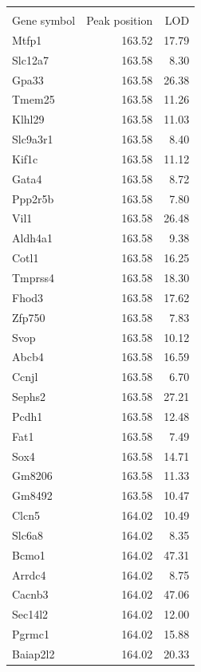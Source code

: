 \documentclass{article}
\begin{document}
\printbibliography

\newpage
\begin{longtable}{lrr}
\hline \\

Gene symbol & Peak position & LOD \\ 
  \hline
Mtfp1 & 163.52 & 17.79 \\ 
  Slc12a7 & 163.58 & 8.30 \\ 
  Gpa33 & 163.58 & 26.38 \\ 
  Tmem25 & 163.58 & 11.26 \\ 
  Klhl29 & 163.58 & 11.03 \\ 
  Slc9a3r1 & 163.58 & 8.40 \\ 
  Kif1c & 163.58 & 11.12 \\ 
  Gata4 & 163.58 & 8.72 \\ 
  Ppp2r5b & 163.58 & 7.80 \\ 
  Vil1 & 163.58 & 26.48 \\ 
  Aldh4a1 & 163.58 & 9.38 \\ 
  Cotl1 & 163.58 & 16.25 \\ 
  Tmprss4 & 163.58 & 18.30 \\ 
  Fhod3 & 163.58 & 17.62 \\ 
  Zfp750 & 163.58 & 7.83 \\ 
  Svop & 163.58 & 10.12 \\ 
  Abcb4 & 163.58 & 16.59 \\ 
  Ccnjl & 163.58 & 6.70 \\ 
  Sephs2 & 163.58 & 27.21 \\ 
  Pcdh1 & 163.58 & 12.48 \\ 
  Fat1 & 163.58 & 7.49 \\ 
  Sox4 & 163.58 & 14.71 \\ 
  Gm8206 & 163.58 & 11.33 \\ 
  Gm8492 & 163.58 & 10.47 \\ 
  Clcn5 & 164.02 & 10.49 \\ 
  Slc6a8 & 164.02 & 8.35 \\ 
  Bcmo1 & 164.02 & 47.31 \\ 
  Arrdc4 & 164.02 & 8.75 \\ 
  Cacnb3 & 164.02 & 47.06 \\ 
  Sec14l2 & 164.02 & 12.00 \\ 
  Pgrmc1 & 164.02 & 15.88 \\ 
  Baiap2l2 & 164.02 & 20.33 \\ 

\end{longtable}
\end{document}
